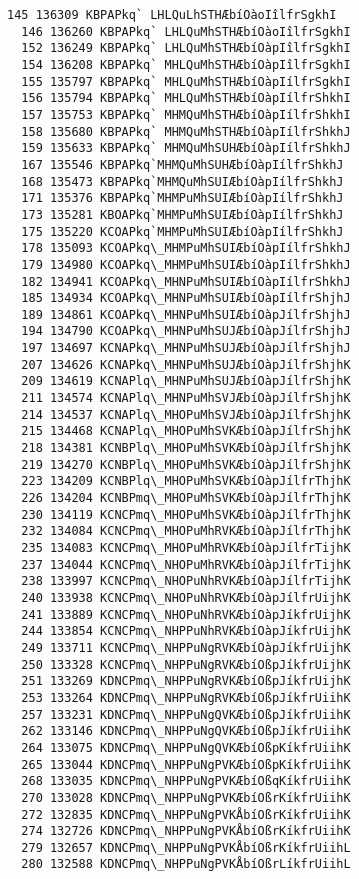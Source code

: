 \documentclass[11pt]{article}
\begin{document}
\begin{Verbatim}[commandchars=\\\{\}]
  145 136309 KBPAPkq` LHLQuLhSTHÆbíOàoIîlfrSgkhI
  146 136260 KBPAPkq` LHLQuMhSTHÆbíOàoIîlfrSgkhI
  152 136249 KBPAPkq` LHLQuMhSTHÆbíOàpIîlfrSgkhI
  154 136208 KBPAPkq` MHLQuMhSTHÆbíOàpIîlfrSgkhI
  155 135797 KBPAPkq` MHLQuMhSTHÆbíOàpIílfrSgkhI
  156 135794 KBPAPkq` MHLQuMhSTHÆbíOàpIílfrShkhI
  157 135753 KBPAPkq` MHMQuMhSTHÆbíOàpIílfrShkhI
  158 135680 KBPAPkq` MHMQuMhSTHÆbíOàpIílfrShkhJ
  159 135633 KBPAPkq` MHMQuMhSUHÆbíOàpIílfrShkhJ
  167 135546 KBPAPkq`MHMQuMhSUHÆbíOàpIílfrShkhJ
  168 135473 KBPAPkq`MHMQuMhSUIÆbíOàpIílfrShkhJ
  171 135376 KBPAPkq`MHMPuMhSUIÆbíOàpIílfrShkhJ
  173 135281 KBOAPkq`MHMPuMhSUIÆbíOàpIílfrShkhJ
  175 135220 KCOAPkq`MHMPuMhSUIÆbíOàpIílfrShkhJ
  178 135093 KCOAPkq\_MHMPuMhSUIÆbíOàpIílfrShkhJ
  179 134980 KCOAPkq\_MHMPuMhSUIÆbíOàpIílfrShkhJ
  182 134941 KCOAPkq\_MHNPuMhSUIÆbíOàpIílfrShkhJ
  185 134934 KCOAPkq\_MHNPuMhSUIÆbíOàpIílfrShjhJ
  189 134861 KCOAPkq\_MHNPuMhSUIÆbíOàpJílfrShjhJ
  194 134790 KCOAPkq\_MHNPuMhSUJÆbíOàpJílfrShjhJ
  197 134697 KCNAPkq\_MHNPuMhSUJÆbíOàpJílfrShjhJ
  207 134626 KCNAPkq\_MHNPuMhSUJÆbíOàpJílfrShjhK
  209 134619 KCNAPlq\_MHNPuMhSUJÆbíOàpJílfrShjhK
  211 134574 KCNAPlq\_MHNPuMhSVJÆbíOàpJílfrShjhK
  214 134537 KCNAPlq\_MHOPuMhSVJÆbíOàpJílfrShjhK
  215 134468 KCNAPlq\_MHOPuMhSVKÆbíOàpJílfrShjhK
  218 134381 KCNBPlq\_MHOPuMhSVKÆbíOàpJílfrShjhK
  219 134270 KCNBPlq\_MHOPuMhSVKÆbíOàpJílfrShjhK
  223 134209 KCNBPlq\_MHOPuMhSVKÆbíOàpJílfrThjhK
  226 134204 KCNBPmq\_MHOPuMhSVKÆbíOàpJílfrThjhK
  230 134119 KCNCPmq\_MHOPuMhSVKÆbíOàpJílfrThjhK
  232 134084 KCNCPmq\_MHOPuMhRVKÆbíOàpJílfrThjhK
  235 134083 KCNCPmq\_MHOPuMhRVKÆbíOàpJílfrTijhK
  237 134044 KCNCPmq\_NHOPuMhRVKÆbíOàpJílfrTijhK
  238 133997 KCNCPmq\_NHOPuNhRVKÆbíOàpJílfrTijhK
  240 133938 KCNCPmq\_NHOPuNhRVKÆbíOàpJílfrUijhK
  241 133889 KCNCPmq\_NHOPuNhRVKÆbíOàpJíkfrUijhK
  244 133854 KCNCPmq\_NHPPuNhRVKÆbíOàpJíkfrUijhK
  249 133711 KCNCPmq\_NHPPuNgRVKÆbíOàpJíkfrUijhK
  250 133328 KCNCPmq\_NHPPuNgRVKÆbíOßpJíkfrUijhK
  251 133269 KDNCPmq\_NHPPuNgRVKÆbíOßpJíkfrUijhK
  253 133264 KDNCPmq\_NHPPuNgRVKÆbíOßpJíkfrUiihK
  257 133231 KDNCPmq\_NHPPuNgQVKÆbíOßpJíkfrUiihK
  262 133146 KDNCPmq\_NHPPuNgQVKÆbíOßpJíkfrUiihK
  264 133075 KDNCPmq\_NHPPuNgQVKÆbíOßpKíkfrUiihK
  265 133044 KDNCPmq\_NHPPuNgPVKÆbíOßpKíkfrUiihK
  268 133035 KDNCPmq\_NHPPuNgPVKÆbíOßqKíkfrUiihK
  270 133028 KDNCPmq\_NHPPuNgPVKÆbíOßrKíkfrUiihK
  272 132835 KDNCPmq\_NHPPuNgPVKÅbíOßrKíkfrUiihK
  274 132726 KDNCPmq\_NHPPuNgPVKÅbíOßrKíkfrUiihK
  279 132657 KDNCPmq\_NHPPuNgPVKÅbíOßrKíkfrUiihL
  280 132588 KDNCPmq\_NHPPuNgPVKÅbíOßrLíkfrUiihL

\end{Verbatim}
\end{document}
